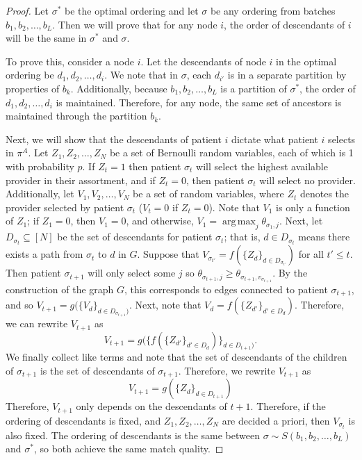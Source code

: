 \documentclass[11pt]{article}
\DeclareMathOperator*{\argmax}{arg\,max}
\begin{document}
\optimalordering*
\begin{proof}
    Let $\sigma^{*}$ be the optimal ordering and let $\sigma$ be any ordering from batches $b_{1},b_{2},\ldots,b_{L}$. 
    Then we will prove that for any node $i$, the order of descendants of $i$ will be the same in $\sigma^{*}$ and $\sigma$. 

    To prove this, consider a node $i$. 
    Let the descendants of node $i$ in the optimal ordering be $d_{1},d_{2},\ldots,d_{i}$. 
    We note that in $\sigma$, each $d_{i'}$ is in a separate partition by properties of $b_{k}$. 
    Additionally, because $b_{1},b_{2},\ldots,b_{L}$ is a partition of $\sigma^{*}$, the order of $d_{1},d_{2},\ldots,d_{i}$ is maintained. 
    Therefore, for any node, the same set of ancestors is maintained through the partition $b_{k}$. 

    Next, we will show that the descendants of patient $i$ dictate what patient $i$ selects in $\pi^{A}$. 
    Let $Z_{1}, Z_{2},\ldots,Z_{N}$ be a set of Bernoulli random variables, each of which is 1 with probability $p$.
    If $Z_{t}=1$ then patient $\sigma_{t}$ will select the highest available provider in their assortment, and if $Z_{t}=0$, then patient $\sigma_{t}$ will select no provider. 
    Additionally, let $V_{1}, V_{2}, \ldots, V_{N}$ be a set of random variables, where $Z_{t}$ denotes the provider selected by patient $\sigma_{t}$ ($V_{t} = 0$ if $Z_{t}=0$). 
    Note that $V_{1}$ is only a function of $Z_{1}$; if $Z_{1}=0$, then $V_{1}=0$, and otherwise, $V_{1} = \argmax_{j} \theta_{\sigma_{1},j}$. 
    Next, let $D_{\sigma_{t}} \subseteq [N]$ be the set of descendants for patient $\sigma_{t}$; that is, $d \in D_{\sigma_{t}}$ means there exists a path from $\sigma_{t}$ to $d$ in $G$. 
    Suppose that $V_{\sigma_{t'}} = f(\{Z_{d}\}_{d \in D_{\sigma_{t'}}})$ for all $t' \leq t$. 
    Then patient $\sigma_{t+1}$ will only select some $j$ so $\theta_{\sigma_{t+1},j} \geq \theta_{\sigma_{t+1},v_{\sigma_{t+1}}}$. 
    By the construction of the graph $G$, this corresponds to edges connected to patient $\sigma_{t+1}$, and so $V_{t+1} = g(\{V_{d}\}_{d \in D_{\sigma_{t+1}})}$.
    Next, note that $V_{d} = f(\{Z_{d'}\}_{d' \in D_{d}})$. 
    Therefore, we can rewrite $V_{t+1}$ as 
    \begin{equation}
        V_{t+1} = g(\{f(\{Z_{d'}\}_{d' \in D_{d}})\}_{d \in D_{t+1})}.
    \end{equation}
    We finally collect like terms and note that the set of descendants of the children of $\sigma_{t+1}$ is the set of descendants of $\sigma_{t+1}$. 
    Therefore, we rewrite $V_{t+1}$ as 
    \begin{equation}
        V_{t+1} = g(\{Z_{d}\}_{d \in D_{t+1}})
    \end{equation}
    Therefore, $V_{t+1}$ only depends on the descendants of $t+1$.
    Therefore, if the ordering of descendants is fixed, and $Z_{1},Z_{2},\ldots,Z_{N}$ are decided a priori, then $V_{\sigma_{t}}$ is also fixed. 
    The ordering of descendants is the same between $\sigma \sim S(b_{1},b_{2},\ldots,b_{L})$ and $\sigma^{*}$, so both achieve the same match quality. 
\end{proof}
\end{document}
